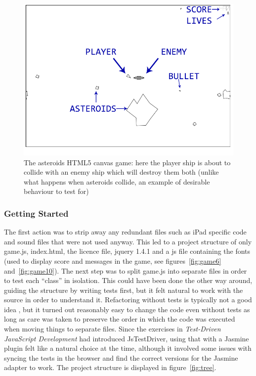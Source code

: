 \documentclass[11pt]{article}
\begin{document}
\begin{figure}[ht!]
\centering
\includegraphics[width=1.0\textwidth]{pics/game3.png}
\caption{The asteroids HTML5 canvas game: here the player ship is about to collide with an enemy ship which will destroy them both (unlike what happens when asteroids collide, an example of desirable behaviour to test for)}
\label{fig:game3}
\end{figure}

\subsubsection{Getting Started}
\label{ssubsec:gettingstarted}

The first action was to strip away any redundant files such as iPad specific code and sound files that were not used anyway. This led to a project structure of only game.js, index.html, the licence file, jquery 1.4.1 and a \gls{js} file containing the fonts (used to display score and messages in the game, see figures~\ref{fig:game6} and~\ref{fig:game10}). The next step was to split game.js into separate files in order to test each ``class'' in isolation. This could have been done the other way around, guiding the structure by writing tests first, but it felt natural to work with the source in order to understand it. Refactoring without tests is typically not a good idea \cite[p.~17]{Refactoring}, but it turned out reasonably easy to change the code even without tests as long as care was taken to preserve the order in which the code was executed when moving things to separate files. Since the exercises in \emph{Test-Driven JavaScript Development} \cite{Tddjs} had introduced JsTestDriver, using that with a Jasmine plugin felt like a natural choice at the time, although it involved some issues with syncing the tests in the browser and find the correct versions for the Jasmine adapter to work. The project structure is displayed in figure~\ref{fig:tree}.
\end{document}
